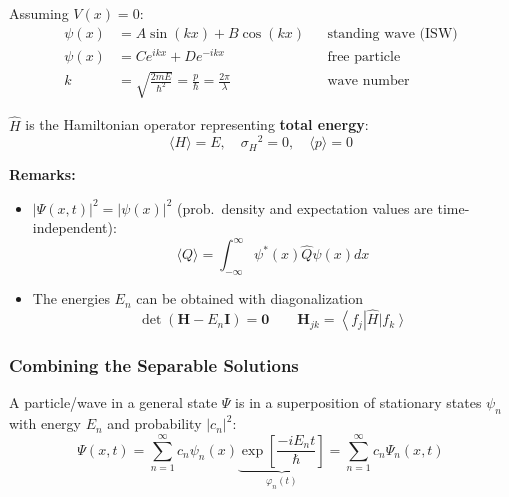 \newpar{}
Assuming $V(x) = 0$:
\noindent\begin{align*}
    \psi(x) & =A\sin(kx)+B\cos(kx)                                               &  & \text{standing wave (ISW)} \\
    \psi(x) & =Ce^{ikx}+De^{-ikx}                                                &  & \text{free particle}       \\
    k       & =\sqrt{\frac{2mE}{\hbar^{2}}}=\frac{p}{\hbar}=\frac{2\pi}{\lambda} &  & \text{wave number}
\end{align*}


$\widehat{H}$ is the Hamiltonian operator representing \textbf{total energy}:
\noindent\begin{equation*}
    \langle H\rangle = E,\quad{\sigma_H}^2 = 0, \quad \langle p\rangle = 0
\end{equation*}

\newpar{}

\textbf{Remarks:}
\begin{itemize}
    \item $|\Psi(x,t)|^2 = |\psi(x)|^2$ (prob.\ density and expectation values are time-independent):
          \noindent\begin{equation*}
              \langle Q\rangle=\int_{-\infty}^\infty\psi^*(x)\widehat{Q}\psi(x)dx
          \end{equation*}
    \item The energies $E_n$ can be obtained with diagonalization
          \noindent\begin{equation*}
              \det\left(\mathbf{H}-E_n \mathbf{I}\right) = \mathbf{0} \qquad \mathbf{H}_{jk} = \left\langle f_j\right|\widehat{H}\left|f_k \right\rangle
          \end{equation*}
\end{itemize}

\subsubsection{Combining the Separable Solutions}
A particle/wave in a general state $\Psi$ is in a superposition of stationary states $\psi_n$ with energy $E_n$ and probability $|c_n|^2$:
\noindent\begin{equation*}
    \Psi(x,t) =\sum_{n=1}^\infty c_n\psi_n(x) \underbrace{\exp\left[\frac{-iE_n t}{\hbar}\right]}_{\varphi_n(t)}=\sum_{n=1}^\infty c_n\Psi_n(x,t)
\end{equation*}

